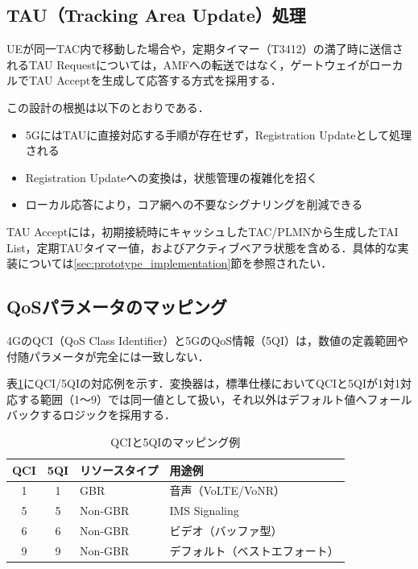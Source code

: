 \subsection{TAU（Tracking Area Update）処理}
\label{subsec:tau_design}
UEが同一TAC内で移動した場合や，定期タイマー（T3412）の満了時に送信されるTAU Requestについては，AMFへの転送ではなく，ゲートウェイがローカルでTAU Acceptを生成して応答する方式を採用する．

この設計の根拠は以下のとおりである．
\begin{itemize}
\item 5GにはTAUに直接対応する手順が存在せず，Registration Updateとして処理される
\item Registration Updateへの変換は，状態管理の複雑化を招く
\item ローカル応答により，コア網への不要なシグナリングを削減できる
\end{itemize}

TAU Acceptには，初期接続時にキャッシュしたTAC/PLMNから生成したTAI List，定期TAUタイマー値，およびアクティブベアラ状態を含める．具体的な実装については\ref{sec:prototype_implementation}節を参照されたい．

\subsection{QoSパラメータのマッピング}
\label{subsec:qos_mapping}
4GのQCI（QoS Class Identifier）\cite{3GPP_TS23203}と5GのQoS情報（5QI）\cite{3GPP_TS23501_R15}は，数値の定義範囲や付随パラメータが完全には一致しない．

表\ref{tab:qos_mapping}にQCI/5QIの対応例を示す．変換器は，標準仕様においてQCIと5QIが1対1対応する範囲（1〜9）では同一値として扱い，それ以外はデフォルト値へフォールバックするロジックを採用する．

\begin{table}[h]
\centering
\caption{QCIと5QIのマッピング例}
\label{tab:qos_mapping}
\begin{tabular}{|c|c|l|l|}
\hline
\textbf{QCI} & \textbf{5QI} & \textbf{リソースタイプ} & \textbf{用途例} \\
\hline
1 & 1 & GBR & 音声（VoLTE/VoNR） \\
5 & 5 & Non-GBR & IMS Signaling \\
6 & 6 & Non-GBR & ビデオ（バッファ型） \\
9 & 9 & Non-GBR & デフォルト（ベストエフォート） \\
\hline
\end{tabular}
\end{table}

